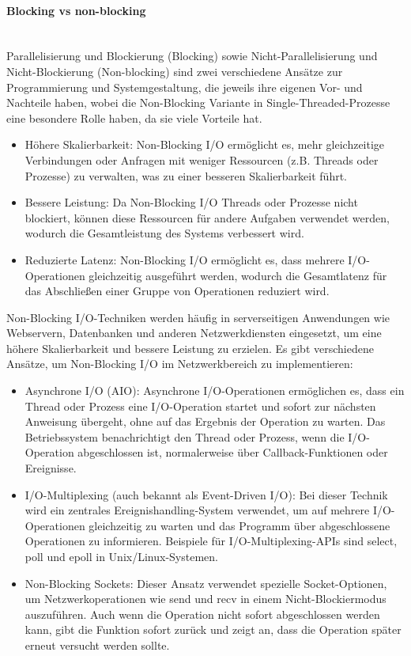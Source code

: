 \paragraph{Blocking vs non-blocking\\\\}
Parallelisierung und Blockierung (Blocking) sowie Nicht-Parallelisierung und Nicht-Blockierung (Non-blocking) sind zwei verschiedene Ansätze zur Programmierung und Systemgestaltung, die jeweils ihre eigenen Vor- und Nachteile haben, wobei die Non-Blocking Variante in Single-Threaded-Prozesse eine besondere Rolle haben, da sie viele Vorteile hat. 
\begin{itemize}
\item Höhere Skalierbarkeit: Non-Blocking I/O ermöglicht es, mehr gleichzeitige Verbindungen oder Anfragen mit weniger Ressourcen (z.B. Threads oder Prozesse) zu verwalten, was zu einer besseren Skalierbarkeit führt.
\item Bessere Leistung: Da Non-Blocking I/O Threads oder Prozesse nicht blockiert, können diese Ressourcen für andere Aufgaben verwendet werden, wodurch die Gesamtleistung des Systems verbessert wird.
\item Reduzierte Latenz: Non-Blocking I/O ermöglicht es, dass mehrere I/O-Operationen gleichzeitig ausgeführt werden, wodurch die Gesamtlatenz für das Abschließen einer Gruppe von Operationen reduziert wird.
\end{itemize}
Non-Blocking I/O-Techniken werden häufig in serverseitigen Anwendungen wie Webservern, Datenbanken und anderen Netzwerkdiensten eingesetzt, um eine höhere Skalierbarkeit und bessere Leistung zu erzielen. Es gibt verschiedene Ansätze, um Non-Blocking I/O im Netzwerkbereich zu implementieren:
\begin{itemize}
\item Asynchrone I/O (AIO): Asynchrone I/O-Operationen ermöglichen es, dass ein Thread oder Prozess eine I/O-Operation startet und sofort zur nächsten Anweisung übergeht, ohne auf das Ergebnis der Operation zu warten. Das Betriebssystem benachrichtigt den Thread oder Prozess, wenn die I/O-Operation abgeschlossen ist, normalerweise über Callback-Funktionen oder Ereignisse.
\item I/O-Multiplexing (auch bekannt als Event-Driven I/O): Bei dieser Technik wird ein zentrales Ereignishandling-System verwendet, um auf mehrere I/O-Operationen gleichzeitig zu warten und das Programm über abgeschlossene Operationen zu informieren. Beispiele für I/O-Multiplexing-APIs sind select, poll und epoll in Unix/Linux-Systemen.
\item Non-Blocking Sockets: Dieser Ansatz verwendet spezielle Socket-Optionen, um Netzwerkoperationen wie send und recv in einem Nicht-Blockiermodus auszuführen. Auch wenn die Operation nicht sofort abgeschlossen werden kann, gibt die Funktion sofort zurück und zeigt an, dass die Operation später erneut versucht werden sollte.
\end{itemize}
